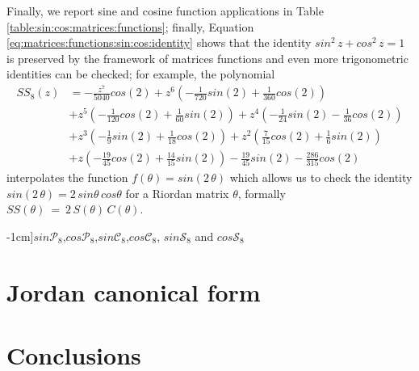 Finally, we report sine and cosine function applications in Table
\ref{table:sin:cos:matrices:functions}; finally, Equation
\ref{eq:matrices:functions:sin:cos:identity} shows that the identity
$sin^{2}\,z + cos^{2}\,z=1$ is preserved by the framework of matrices functions
and even more trigonometric identities can be checked; for example, the
polynomial
\begin{displaymath}
\begin{split}
{SS_{ 8 }}{\left (z \right )} &= - \frac{z^{7}}{5040} cos{\left (2 \right )} + z^{6} \left(- \frac{1}{720} sin{\left (2 \right )} + \frac{1}{360} cos{\left (2 \right )}\right) \\
    &+ z^{5} \left(- \frac{1}{120} cos{\left (2 \right )} + \frac{1}{60} sin{\left (2 \right )}\right) + z^{4} \left(- \frac{1}{24} sin{\left (2 \right )} - \frac{1}{36} cos{\left (2 \right )}\right) \\
    &+ z^{3} \left(- \frac{1}{9} sin{\left (2 \right )} + \frac{1}{18} cos{\left (2 \right )}\right)  + z^{2} \left(\frac{7}{15} cos{\left (2 \right )} + \frac{1}{6} sin{\left (2 \right )}\right) \\
    &+ z \left(- \frac{19}{45} cos{\left (2 \right )} + \frac{14}{15} sin{\left (2 \right )}\right) - \frac{19}{45} sin{\left (2 \right )} - \frac{286}{315} cos{\left (2 \right )}
\end{split}
\end{displaymath}
interpolates the function $f(\theta)=sin(2\,\theta)$
which allows us to check the identity $sin(2\,\theta)=2\,sin\theta\,cos\theta$ 
for a Riordan matrix $\theta$, formally $SS(\theta)~=~2\,S(\theta)\,C(\theta)$.

\iffalse
In the same spirit, many other functions and their relations with already
studied ones could be an interesting field of investigation -- we would recall
that before starting the lifting process of a scalar function, the user
has to pay attention to the correct definition of the generalized Lagrange base
because it all depends on the eigenvalues of the matrix under study.
\fi


\begin{table}
    \caption[][-1cm]{$sin{\mathcal{P}_{8}}$,$cos{\mathcal{P}_{8}}$,$sin{\mathcal{C}_{8}}$,$cos{\mathcal{C}_{8}}$,
$sin{\mathcal{S}_{8}}$ and $cos{\mathcal{S}_{8}}$}

\label{table:sin:cos:matrices:functions}
\end{table}


\section{Jordan canonical form}





\section{Conclusions}



\vfill






